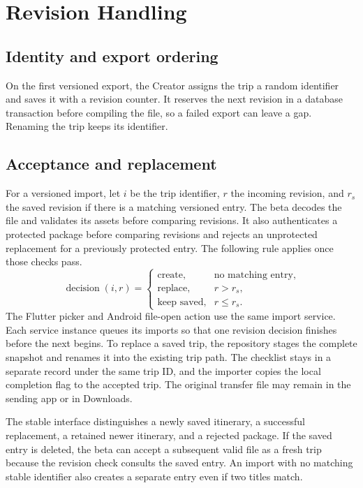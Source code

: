 \section{Revision Handling}
\subsection{Identity and export ordering}
On the first versioned export, the Creator assigns the trip a random identifier and saves it with a revision counter. It reserves the next revision in a database transaction before compiling the file, so a failed export can leave a gap. Renaming the trip keeps its identifier.

\subsection{Acceptance and replacement}
For a versioned import, let $i$ be the trip identifier, $r$ the incoming revision, and $r_s$ the saved revision if there is a matching versioned entry. The beta decodes the file and validates its assets before comparing revisions. It also authenticates a protected package before comparing revisions and rejects an unprotected replacement for a previously protected entry. The following rule applies once those checks pass.
\begin{equation}
\operatorname{decision}(i,r)=
\begin{cases}
\text{create}, & \text{no matching entry},\\
\text{replace}, & r>r_s,\\
\text{keep saved}, & r\leq r_s.
\end{cases}
\label{eq:revisions}
\end{equation}
The Flutter picker and Android file-open action use the same import service. Each service instance queues its imports so that one revision decision finishes before the next begins. To replace a saved trip, the repository stages the complete snapshot and renames it into the existing trip path. The checklist stays in a separate record under the same trip ID, and the importer copies the local completion flag to the accepted trip. The original transfer file may remain in the sending app or in Downloads.

The stable interface distinguishes a newly saved itinerary, a successful replacement, a retained newer itinerary, and a rejected package. If the saved entry is deleted, the beta can accept a subsequent valid file as a fresh trip because the revision check consults the saved entry. An import with no matching stable identifier also creates a separate entry even if two titles match.

